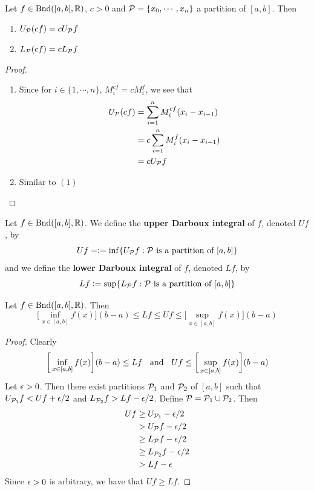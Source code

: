 \documentclass{book}
\begin{document}
	\begin{ex}  
		Let $f \in \text{Bnd}([a,b], \mathbb{R})$, $c >0$ and $\mathcal{P} = \{x_0, \cdots, x_n\}$ a partition of $[a,b]$. Then 
		\begin{enumerate}
			\item $U_{\mathcal{P}} (cf) = c U_{\mathcal{P}} f$ 
			\item $L_{\mathcal{P}} (cf) = c L_{\mathcal{P}} f $
		\end{enumerate}
	\end{ex}

	\begin{proof}\
		\begin{enumerate}
			\item Since for $i \in \{1, \cdots, n\}$, $M^{cf}_i = cM^f_i$, we see that  
			\begin{align*}
				U_{\mathcal{P}} (cf) 
				&= \sum\limits_{i=1}^n M^{cf}_i (x_i - x_{i-1}) \\
				&= c \sum\limits_{i=1}^n M^f_i (x_i - x_{i-1}) \\
				&= c U_{\mathcal{P}} f
			\end{align*}
			\item Similar to $(1)$
		\end{enumerate}
	\end{proof}
	
	\begin{defn}  
		Let $f \in \text{Bnd}([a,b], \mathbb{R})$. We define the \textbf{upper Darboux integral} of $f$, denoted $U f$, by
		$$Uf =\vcentcolon= \inf \{U_{\mathcal{P}} f: \mathcal{P} \text{ is a partition of } [a,b]\}$$
		and we define the \textbf{lower Darboux integral} of $f$, denoted $L f$, by 
		$$Lf \vcentcolon= \sup \{L_{\mathcal{P}} f: \mathcal{P} \text{ is a partition of } [a,b]\}$$ 
	\end{defn}

	\begin{ex}  
		Let $f \in \text{Bnd}([a,b], \mathbb{R})$. Then $$ \bigg[\inf_{x \in [a,b]} f(x) \bigg] (b-a) \leq Lf \leq Uf \leq \bigg[\sup\limits_{x \in [a,b]} f(x) \bigg] (b-a)$$
	\end{ex}

	\begin{proof}
		Clearly $$\bigg[\inf_{x \in [a,b]} f(x) \bigg] (b-a) \leq Lf \hspace{.2cm } \text{ and } \hspace{.2cm } Uf \leq \bigg[\sup\limits_{x \in [a,b]} f(x) \bigg] (b-a)$$ 
		Let $\epsilon >0$. Then there exist partitions $\mathcal{P}_1$ and $\mathcal{P}_2$ of $[a,b]$ such that $U_{\mathcal{P}_1} f < U f + \epsilon/2$ and $L_{\mathcal{P}_2} f > Lf - \epsilon/2 $. Define $\mathcal{P} = \mathcal{P}_1 \cup \mathcal{P}_2$. Then 
		\begin{align*}
			Uf 
			& \geq U_{\mathcal{P}_1}  - \epsilon/2 \\
			&> U_{\mathcal{P}} f - \epsilon/2 \\
			&\geq L_{\mathcal{P}} f -\epsilon/2 \\
			&\geq L_{\mathcal{P}_2} f -\epsilon/2 \\
			&> L f - \epsilon
		\end{align*} 
		Since $\epsilon >0$ is arbitrary, we have that $Uf \geq Lf$.
	\end{proof}
\end{document}
